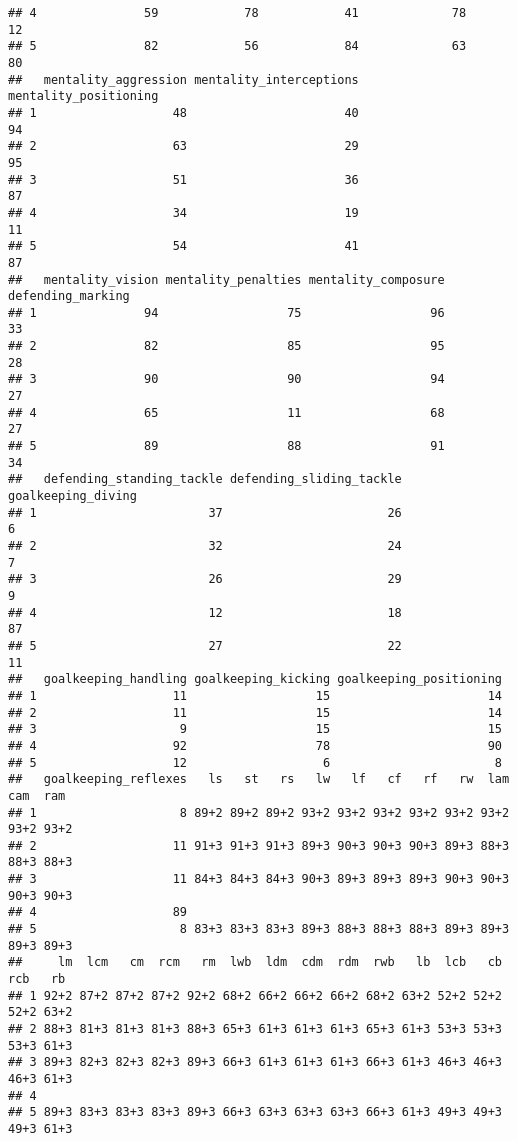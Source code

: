 \documentclass[
]{article}
\begin{document}
\begin{verbatim}
## 4               59            78            41             78               12
## 5               82            56            84             63               80
##   mentality_aggression mentality_interceptions mentality_positioning
## 1                   48                      40                    94
## 2                   63                      29                    95
## 3                   51                      36                    87
## 4                   34                      19                    11
## 5                   54                      41                    87
##   mentality_vision mentality_penalties mentality_composure defending_marking
## 1               94                  75                  96                33
## 2               82                  85                  95                28
## 3               90                  90                  94                27
## 4               65                  11                  68                27
## 5               89                  88                  91                34
##   defending_standing_tackle defending_sliding_tackle goalkeeping_diving
## 1                        37                       26                  6
## 2                        32                       24                  7
## 3                        26                       29                  9
## 4                        12                       18                 87
## 5                        27                       22                 11
##   goalkeeping_handling goalkeeping_kicking goalkeeping_positioning
## 1                   11                  15                      14
## 2                   11                  15                      14
## 3                    9                  15                      15
## 4                   92                  78                      90
## 5                   12                   6                       8
##   goalkeeping_reflexes   ls   st   rs   lw   lf   cf   rf   rw  lam  cam  ram
## 1                    8 89+2 89+2 89+2 93+2 93+2 93+2 93+2 93+2 93+2 93+2 93+2
## 2                   11 91+3 91+3 91+3 89+3 90+3 90+3 90+3 89+3 88+3 88+3 88+3
## 3                   11 84+3 84+3 84+3 90+3 89+3 89+3 89+3 90+3 90+3 90+3 90+3
## 4                   89                                                       
## 5                    8 83+3 83+3 83+3 89+3 88+3 88+3 88+3 89+3 89+3 89+3 89+3
##     lm  lcm   cm  rcm   rm  lwb  ldm  cdm  rdm  rwb   lb  lcb   cb  rcb   rb
## 1 92+2 87+2 87+2 87+2 92+2 68+2 66+2 66+2 66+2 68+2 63+2 52+2 52+2 52+2 63+2
## 2 88+3 81+3 81+3 81+3 88+3 65+3 61+3 61+3 61+3 65+3 61+3 53+3 53+3 53+3 61+3
## 3 89+3 82+3 82+3 82+3 89+3 66+3 61+3 61+3 61+3 66+3 61+3 46+3 46+3 46+3 61+3
## 4                                                                           
## 5 89+3 83+3 83+3 83+3 89+3 66+3 63+3 63+3 63+3 66+3 61+3 49+3 49+3 49+3 61+3
\end{verbatim}
\end{document}
